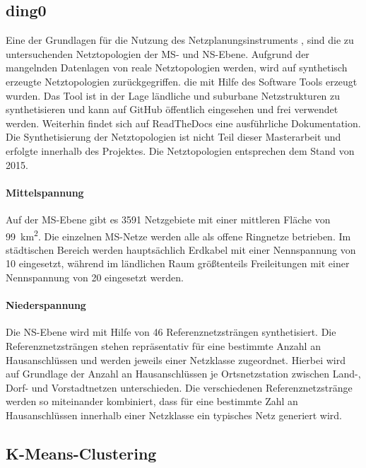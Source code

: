 \subsection{ding0}\label{chap:dingo_theo}

Eine der Grundlagen für die Nutzung des Netzplanungsinstruments \edisgodot, sind die zu untersuchenden Netztopologien der \gls{MS}- und \gls{NS}-Ebene.
Aufgrund der mangelnden Datenlagen von reale Netztopologien werden, wird auf synthetisch erzeugte Netztopologien zurückgegriffen.
die mit Hilfe des Software Tools \dingo erzeugt wurden.
Das Tool ist in der Lage ländliche und suburbane Netzstrukturen zu synthetisieren und kann auf GitHub \cite{dingo2019} öffentlich eingesehen und frei verwendet werden.
Weiterhin findet sich auf ReadTheDocs \cite{dingo-docs2019} eine ausführliche Dokumentation.
Die Synthetisierung der Netztopologien ist nicht Teil dieser Masterarbeit und erfolgte innerhalb des \openego Projektes. \cite{Mueller2019} Die Netztopologien entsprechen dem Stand von \num{2015}.


\paragraph{Mittelspannung}

Auf der \gls{MS}-Ebene gibt es \num{3591} Netzgebiete mit einer mittleren Fläche von \SI{99}{\km\squared}.
Die einzelnen \gls{MS}-Netze werden alle als offene Ringnetze betrieben.
Im städtischen Bereich werden hauptsächlich Erdkabel mit einer Nennspannung von \SI{10}{\kv} eingesetzt, während im ländlichen Raum größtenteils Freileitungen mit einer Nennspannung von \SI{20}{\kv} eingesetzt werden. \cite{Mueller2019}


\paragraph{Niederspannung}

Die \gls{NS}-Ebene wird mit Hilfe von \num{46} Referenznetzsträngen synthetisiert.
Die Referenznetzsträngen stehen repräsentativ für eine bestimmte Anzahl an Hausanschlüssen und werden jeweils einer Netzklasse zugeordnet.
Hierbei wird auf Grundlage der Anzahl an Hausanschlüssen je Ortsnetzstation zwischen Land-, Dorf- und Vorstadtnetzen unterschieden.
Die verschiedenen Referenznetzstränge werden so miteinander kombiniert, dass für eine bestimmte Zahl an Hausanschlüssen innerhalb einer Netzklasse ein typisches Netz generiert wird. \cite{Mueller2019}


\subsection{K-Means-Clustering}

